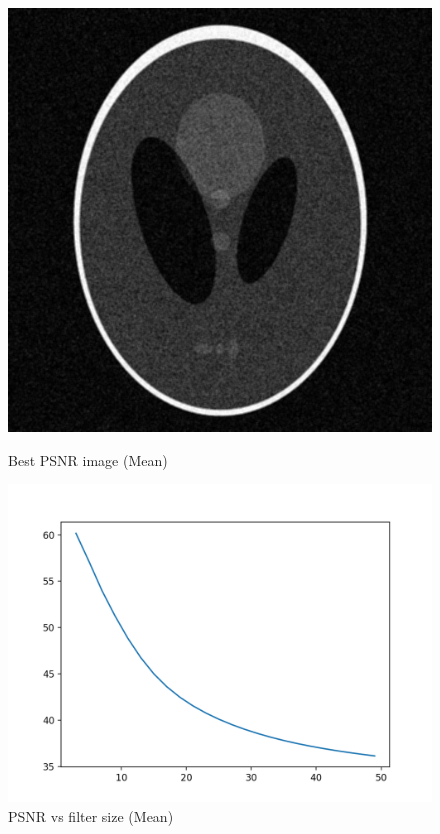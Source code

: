\documentclass{article}
\begin{document}
    \begin{figure}[!htb]
      \includegraphics[scale=0.3]{./basic_denoising/shepplogan/average_best_gaussian.png}
      \caption{Best PSNR image (Mean)}
    \endminipage \hfill
      \includegraphics[scale=.45]{./basic_denoising/shepplogan/average_psnr_gaussian.png}
      \caption{PSNR vs filter size (Mean)}
    \endminipage
    \end{figure}
    
\end{document}
